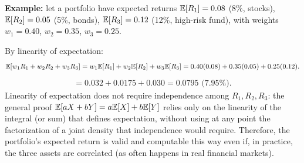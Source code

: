 \begin{solproblema}[prob:5c186f2]
	\textbf{Example:} let a portfolio have expected returns $\mathbb{E}[R_1]=0.08$ (8\%, stocks), $\mathbb{E}[R_2]=0.05$ (5\%, bonds), $\mathbb{E}[R_3]=0.12$ (12\%, high-risk fund), with weights $w_1=0.40$, $w_2=0.35$, $w_3=0.25$.

	By linearity of expectation:
	\begin{align*}
		\mathbb{E}[w_1R_1+w_2R_2+w_3R_3] = w_1\mathbb{E}[R_1]+w_2\mathbb{E}[R_2]+w_3\mathbb{E}[R_3] = 0.40(0.08)+0.35(0.05)+0.25(0.12).
	\end{align*}
	\begin{align*}
		= 0.032+0.0175+0.030 = 0.0795 \text{ (7.95\%).}
	\end{align*}
	Linearity of expectation does not require independence among $R_1, R_2, R_3$: the general proof $\mathbb{E}[aX+bY]=a\mathbb{E}[X]+b\mathbb{E}[Y]$ relies only on the linearity of the integral (or sum) that defines expectation, without using at any point the factorization of a joint density that independence would require. Therefore, the portfolio's expected return is valid and computable this way even if, in practice, the three assets are correlated (as often happens in real financial markets).
\end{solproblema}
